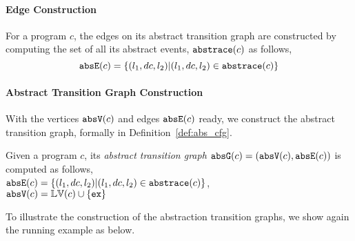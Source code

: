  \paragraph{Edge Construction}
For a program $c$, the edges on its abstract transition graph are constructed by computing the set of all its abstract events, $\mathtt{abs}{\mathtt{trace}}(c)$ as follows,
 \[
 \mathtt{abs}{\mathtt{E}}(c) = \{(l_1, dc, l_2) | (l_1, dc, l_2) \in \mathtt{abs}{\mathtt{trace}}(c)\}
 \]
\paragraph{Abstract Transition Graph Construction} 
With the vertices $\mathtt{abs}{\mathtt{V}}(c)$ and edges $\mathtt{abs}{\mathtt{E}}(c)$ ready, we construct the abstract transition graph, formally in
Definition~\ref{def:abs_cfg}.
%
\begin{defn}
\label{def:abs_cfg}
Given a program $c$, 
its \emph{abstract transition graph} $\mathtt{abs}{\mathtt{G}}(c) =(\mathtt{abs}{\mathtt{V}}(c), \mathtt{abs}{\mathtt{E}}(c))$ is computed as follows,
\\
$\mathtt{abs}{\mathtt{E}}(c) = \{(l_1, dc, l_2) | (l_1, dc, l_2) \in \mathtt{abs}{\mathtt{trace}}(c)\}$,
\\
$\mathtt{abs}{\mathtt{V}}(c) = \mathbb{LV}(c)\cup\{\mathtt{ex}\}$
\end{defn}


To illustrate the construction of the abstraction transition graphs, we show again the running example as below.
%
